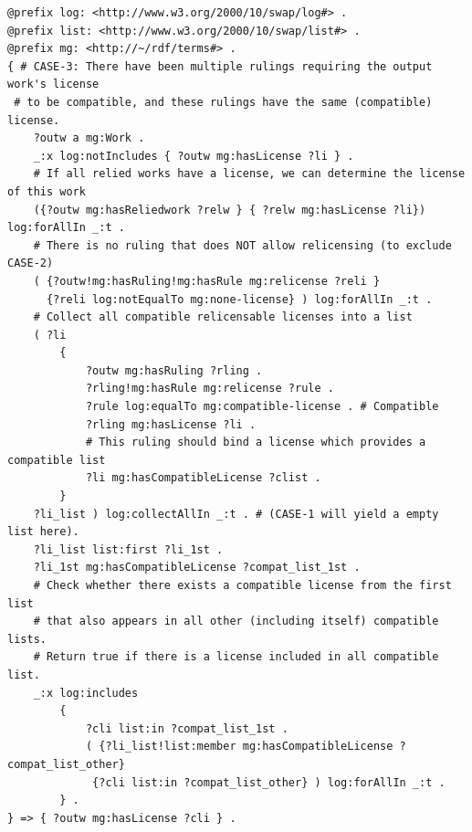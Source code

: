 \begin{tcolorbox}[title=rules\_ruling.n3 > License Determination Logic (snippet), colback=white, colframe=gray, boxrule=0.2mm, boxsep=1mm, left=0mm, right=0mm, top=0.1mm, bottom=0.1mm] %
  \begin{lstlisting}[language=Turtle, breaklines=false, columns=fullflexible, basicstyle=\footnotesize]
@prefix log: <http://www.w3.org/2000/10/swap/log#> .
@prefix list: <http://www.w3.org/2000/10/swap/list#> .
@prefix mg: <http://~/rdf/terms#> .
{ # CASE-3: There have been multiple rulings requiring the output work's license 
 # to be compatible, and these rulings have the same (compatible) license.
    ?outw a mg:Work .
    _:x log:notIncludes { ?outw mg:hasLicense ?li } .
    # If all relied works have a license, we can determine the license of this work
    ({?outw mg:hasReliedwork ?relw } { ?relw mg:hasLicense ?li}) log:forAllIn _:t . 
    # There is no ruling that does NOT allow relicensing (to exclude CASE-2)
    ( {?outw!mg:hasRuling!mg:hasRule mg:relicense ?reli } 
      {?reli log:notEqualTo mg:none-license} ) log:forAllIn _:t .
    # Collect all compatible relicensable licenses into a list
    ( ?li
        { 
            ?outw mg:hasRuling ?rling .
            ?rling!mg:hasRule mg:relicense ?rule .
            ?rule log:equalTo mg:compatible-license . # Compatible
            ?rling mg:hasLicense ?li . 
            # This ruling should bind a license which provides a compatible list
            ?li mg:hasCompatibleLicense ?clist .
        }
    ?li_list ) log:collectAllIn _:t . # (CASE-1 will yield a empty list here).
    ?li_list list:first ?li_1st .
    ?li_1st mg:hasCompatibleLicense ?compat_list_1st .
    # Check whether there exists a compatible license from the first list 
    # that also appears in all other (including itself) compatible lists.
    # Return true if there is a license included in all compatible list.
    _:x log:includes 
        {   
            ?cli list:in ?compat_list_1st .
            ( {?li_list!list:member mg:hasCompatibleLicense ?compat_list_other} 
             {?cli list:in ?compat_list_other} ) log:forAllIn _:t .
        } .
} => { ?outw mg:hasLicense ?cli } .
  \end{lstlisting}
\end{tcolorbox}


